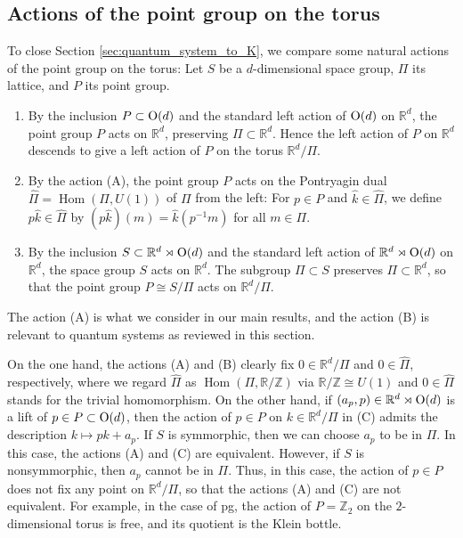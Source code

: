\documentclass[pdftex]{sigma}
\theoremstyle{definition}
\newcommand{\R}{\mathbb{R}}
\newcommand{\Z}{\mathbb{Z}}
\begin{document}
\subsection{Actions of the point group on the torus}%

To close Section \ref{sec:quantum_system_to_K}, we compare some natural actions of the point group on the torus: Let $S$ be a $d$-dimensional space group, $\Pi$ its lattice, and $P$ its point group.
\begin{enumerate}\itemsep=0pt
\item[(A)]
By the inclusion $P \subset {\rm O}(d)$ and the standard left action of ${\rm O}(d)$ on $\R^d$, the point group $P$ acts on $\R^d$, preserving $\Pi \subset \R^d$. Hence the left action of $P$ on $\R^d$ descends to give a left action of $P$ on the torus $\R^d/\Pi$.

\item[(B)]
By the action (A), the point group $P$ acts on the Pontryagin dual $\hat{\Pi} = \operatorname{Hom}(\Pi, U(1))$ of $\Pi$ from the left: For $p \in P$ and $\hat{k} \in \hat{\Pi}$, we def\/ine $p\hat{k} \in \hat{\Pi}$ by $(p\hat{k})(m) = \hat{k}(p^{-1}m)$ for all $m \in \Pi$.

\item[(C)]
By the inclusion $S \subset \R^d \rtimes {\rm O}(d)$ and the standard left action of $\R^d \rtimes {\rm O}(d)$ on $\R^d$, the space group $S$ acts on $\R^d$. The subgroup $\Pi \subset S$ preserves $\Pi \subset \R^d$, so that the point group $P \cong S/\Pi$ acts on $\R^d/\Pi$.
\end{enumerate}

The action (A) is what we consider in our main results, and the action (B) is relevant to quantum systems as reviewed in this section.

On the one hand, the actions (A) and (B) clearly f\/ix $0 \in \R^d/\Pi$ and $0 \in \hat{\Pi}$, respectively, where we regard $\hat{\Pi}$ as $\operatorname{Hom}(\Pi, \R/\Z)$ via $\R/\Z \cong U(1)$ and $0 \in \hat{\Pi}$ stands for the trivial homomorphism. On the other hand, if $(a_p, p) \in \R^d \rtimes {\rm O}(d)$ is a lift of $p \in P \subset {\rm O}(d)$, then the action of $p \in P$ on $k \in \R^d/\Pi$ in (C) admits the description $k \mapsto pk + a_p$. If $S$ is symmorphic, then we can choose $a_p$ to be in $\Pi$. In this case, the actions (A) and (C) are equivalent. However, if $S$ is nonsymmorphic, then $a_p$ cannot be in $\Pi$. Thus, in this case, the action of $p \in P$ does not f\/ix any point on $\R^d/\Pi$, so that the actions (A) and (C) are not equivalent. For example, in the case of \textsf{pg}, the action of $P = \Z_2$ on the $2$-dimensional torus is free, and its quotient is the Klein bottle.
\end{document}
